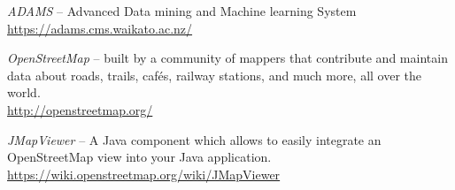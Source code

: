 %

\begin{thebibliography}{999}

		\textit{ADAMS} -- Advanced Data mining and Machine learning System \\
		\url{https://adams.cms.waikato.ac.nz/}{}
		
		\textit{OpenStreetMap} -- built by a community of mappers that 
		contribute and maintain data about roads, trails, cafés, railway 
		stations, and much more, all over the world. \\
		\url{http://openstreetmap.org/}{}
		
		\textit{JMapViewer} -- A Java component which allows to easily 
		integrate an OpenStreetMap view into your Java application. \\
		\url{https://wiki.openstreetmap.org/wiki/JMapViewer}{}

\end{thebibliography}
